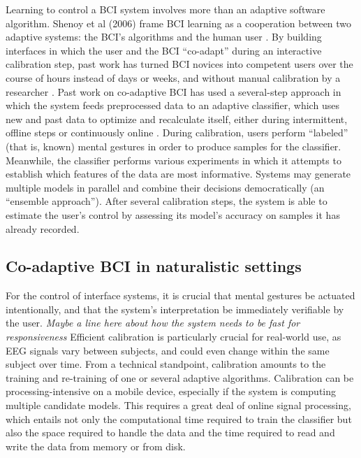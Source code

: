 \noindent Learning to control a BCI system involves more than an adaptive software algorithm. Shenoy et al (2006) frame BCI learning as a cooperation between two adaptive systems: the BCI's algorithms and the human user \cite{shenoy_towards_2006}.  By building interfaces in which the user and the BCI ``co-adapt'' during an interactive calibration step, past work has turned BCI novices into competent users over the course of hours instead of days or weeks, and without manual calibration by a researcher \cite{vidaurre_fully_2006,vidaurre_co-adaptive_2011,vidaurre_machine-learning-based_2011}. 
Past work on co-adaptive BCI has used a several-step approach in which the system feeds preprocessed data to an adaptive classifier, which uses new and past data to optimize and recalculate itself, either during intermittent, offline steps or continuously online \cite{vidaurre_fully_2006,shijian_lu_unsupervised_2009,das_unsupervised_2013}. During calibration, users perform ``labeled'' (that is, known) mental gestures in order to produce samples for the classifier. Meanwhile, the classifier performs various experiments in which it attempts to establish which features of the data are most informative. Systems may generate multiple models in parallel and combine their decisions democratically (an ``ensemble approach''). After several calibration steps, the system is able to estimate the user's control by assessing its model's accuracy on samples it has already recorded.

\subsection{Co-adaptive BCI in naturalistic settings}

\noindent For the control of interface systems, it is crucial that mental gestures be actuated intentionally, and that the system's interpretation be immediately verifiable by the user. \cite{mcfarland_brain-computer_2011,ali_empirical_2014} \textit{Maybe a line here about how the system needs to be fast for responsiveness} Efficient calibration is particularly crucial for real-world use, as EEG signals vary between subjects, and could even change within the same subject over time. From a technical standpoint, calibration amounts to the training and re-training of one or several adaptive algorithms. Calibration can be processing-intensive on a mobile device, especially if the system is computing multiple candidate models. This requires a great deal of online signal processing, which entails not only the computational time required to train the classifier but also the space required to handle the data and the time required to read and write the data from memory or from disk.


